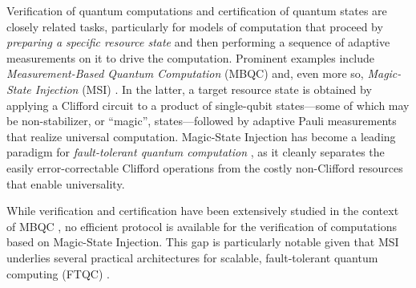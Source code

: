 \documentclass[a4paper,twocolumn,11pt,unpublished]{quantumarticle}
\begin{document}
Verification of quantum computations and certification of quantum states are closely related tasks, particularly for models of computation that proceed by \emph{preparing a specific resource state} and then performing a sequence of adaptive measurements on it to drive the computation. 
Prominent examples include \emph{Measurement-Based Quantum Computation} (MBQC) \cite{RB01one, DKP07measurement, BBDR09measurement} and, even more so, \emph{Magic-State Injection} (MSI) \cite{BK04universal}. 
In the latter, a target resource state is obtained by applying a Clifford circuit to a product of single-qubit states---some of which may be non-stabilizer, or ``magic'', states---followed by adaptive Pauli measurements that realize universal computation. 
Magic-State Injection has become a leading paradigm for \emph{fault-tolerant quantum computation} \cite{DBMA25breaking, G23cleaner, AAAA22suppressing}, as it cleanly separates the easily error-correctable Clifford operations from the costly non-Clifford resources that enable universality.

While verification and certification have been extensively studied in the context of MBQC \cite{TM17verification, TMMM18resource, ZH19efficient, ZH18efficient, LZH23robust}, no efficient protocol is available for the verification of computations based on Magic-State Injection. 
This gap is particularly notable given that MSI underlies several practical architectures for scalable, fault-tolerant quantum computing (FTQC) \cite{MGCM25ibm, GSJ24magic}.
\end{document}
